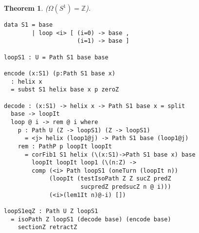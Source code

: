 \documentclass{article}
\newtheorem{theorem}{Theorem}
\begin{document}
\begin{theorem} ($\Omega(S^1)=\mathbb{Z}$).
\begin{lstlisting}
data S1 = base
        | loop <i> [ (i=0) -> base ,
                     (i=1) -> base ]

loopS1 : U = Path S1 base base

encode (x:S1) (p:Path S1 base x)
  : helix x
  = subst S1 helix base x p zeroZ

decode : (x:S1) -> helix x -> Path S1 base x = split
  base -> loopIt
  loop @ i -> rem @ i where
    p : Path U (Z -> loopS1) (Z -> loopS1)
      = <j> helix (loop1@j) -> Path S1 base (loop1@j)
    rem : PathP p loopIt loopIt
      = corFib1 S1 helix (\(x:S1)->Path S1 base x) base
        loopIt loopIt loop1 (\(n:Z) ->
        comp (<i> Path loopS1 (oneTurn (loopIt n))
             (loopIt (testIsoPath Z Z sucZ predZ
                      sucpredZ predsucZ n @ i)))
             (<i>(lem1It n)@-i) [])

loopS1eqZ : Path U Z loopS1
  = isoPath Z loopS1 (decode base) (encode base)
    sectionZ retractZ
\end{lstlisting}
\end{theorem}



\end{document}

